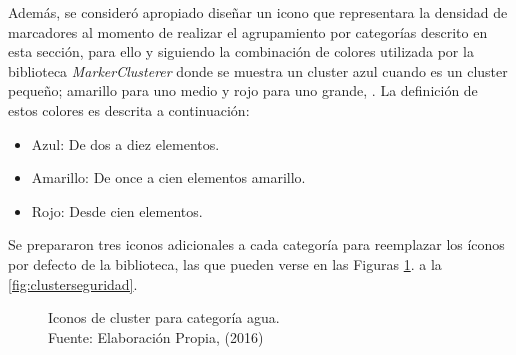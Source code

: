 Además, se consideró apropiado diseñar un icono que representara la densidad de marcadores al momento de realizar el agrupamiento por categorías descrito en esta sección, para ello y siguiendo la combinación de colores utilizada por la biblioteca \textit{MarkerClusterer} donde se muestra un cluster azul cuando es un cluster pequeño; amarillo para uno medio y rojo para uno grande, \citep{MarkerClusterer}. La definición de estos colores es descrita a continuación:

\begin{itemize}
\item Azul: De dos a diez elementos.
\item Amarillo: De once a cien elementos amarillo.
\item Rojo: Desde cien elementos.
\end{itemize}

Se prepararon tres iconos adicionales a cada categoría para reemplazar los íconos por defecto de la biblioteca, las que pueden verse en las Figuras \ref{fig:clusterAgua}. a la \ref{fig:clusterseguridad}.

\begin{figure}[H]
\centering
{}\hfill
{}\hfill
{}
\caption[Iconos de cluster para categoría agua.]{Iconos de cluster para categoría agua.\\Fuente: Elaboración Propia, (2016)}
\label{fig:clusterAgua}
\end{figure}

